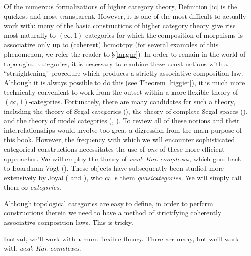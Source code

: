 \begin{1.1.2 inf-Categories}

Of the numerous formalizations of higher category theory, Definition \ref{ic} is the quickest and most transparent. However, it is one of the most difficult to actually work with: many of the basic constructions of higher category theory give rise most naturally to $(\infty,1)$-categories for which the composition of
morphisms is associative only up to (coherent) homotopy (for several examples of this phenomenon, we refer the reader to \S \ref{langur}). In order to remain in the world of topological categories, it is necessary to combine these constructions with a ``straightening'' procedure which
produces a strictly associative composition law. Although it is always possible to do this
(see Theorem \ref{biggier}), it is much more technically convenient to work from the outset
within a more flexible theory of $(\infty,1)$-categories. Fortunately, there are many candidates
for such a theory, including the theory of Segal categories (\cite{simpson2}), the theory of complete Segal spaces (\cite{completesegal}), and the theory of model categories (\cite{hovey}, \cite{hirschhorn}).
To review all of these notions and their interrelationships would
involve too great a digression from the main purpose of this book.
However, the frequency with which we will encounter sophisticated
categorical constructions necessitates the use of {\em one} of
these more efficient approaches. We will employ the theory of {\it weak Kan complexes}, which goes back to Boardman-Vogt (\cite{quasicat}). These objects have subsequently been studied more extensively by Joyal (\cite{joyalpub} and \cite{joyalnotpub}), who calls them {\it quasicategories}. We will simply call them {\it $\infty$-categories}.
\begin{shaded}
Although topological categories are easy to define, in order to perform constructions therein we need to have a method of strictifying coherently associative composition laws. This is tricky.

Instead, we'll work with a more flexible theory. There are many, but we'll work with \textit{weak Kan complexes}.
\end{shaded}



\end{1.1.2 inf-Categories}
